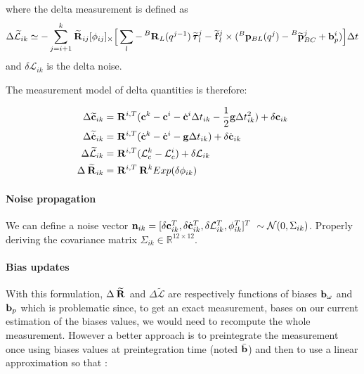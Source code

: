 \documentclass[11pt]{article}
\newcommand{\Rot}[2]{\prescript{#1}{}{\bfR}_{#2}}
\newcommand{\Rotm}[2]{\prescript{#1}{}{\widetilde{\bfR}}_{#2}}
\newcommand{\noise}{\bfn}
\newcommand{\bias}{\bfb}
\newcommand{\posi}[2]{\prescript{#1}{}{\bfp}_{#2}}
\newcommand{\posim}[2]{\prescript{#1}{}{\widetilde{\bfp}}_{#2}}
\newcommand{\forcem}[2]{\prescript{#1}{}{\widetilde{\bff}}_{#2}}
\newcommand{\torquem}[2]{\prescript{#1}{}{\widetilde{\pmb{\tau}}}_{#2}}
\newcommand{\AM}{\mathcal{L}}
\newcommand{\AMm}{\widetilde{\mathcal{L}}}
\newcommand{\COM}{\bfc}
\newcommand{\COMm}{\widetilde{\bfc}}
\newcommand{\COMd}{\dot{\bfc}}
\newcommand{\COMdm}{\widetilde{\dot{\bfc}}}
\newcommand{\grav}{\bfg}
\newcommand{\Gaussian}[2]{\mathcal{N}({#1},{#2})}
\newcommand{\Reals}{\mathbb{R}}
\begin{document}
where the delta measurement is defined as 
\begin{equation}
    \Delta \AMm_{ik} \simeq -\sum_{j=i+1}^{k} \Rotm{}{ij}[\phi_{ij}]_{\times} \Big[ 
    \sum_l -\Rot{B}{L}(q^{j-1}) \torquem{}{l}^{j} - \forcem{}{l}^{j} \times (\posi{B}{BL}(q^j) - \posim{B}{BC}^j + \bias_{p}^i) \Big]  \Delta t
\end{equation}
and $\delta \AM_{ik}$ is the delta noise. 

The measurement model of delta quantities is therefore:

\begin{equation}
\begin{split}
\Delta \COMm_{ik}  &= \Rot{}{}^{i,T} (\COM^k - \COM^i - \COMd{}{}^i \Delta t_{ik} - \frac{1}{2}\grav \Delta t_{ik}^2) + \delta \COM_{ik} 
\\
\Delta \COMdm_{ik} &= \Rot{}{}^{i,T} (\COMd^{k} - \COMd^{i} - \bfg \Delta t_{ik}) + \delta \COMd_{ik}
\\
\Delta \AMm_{ik}   &= \Rot{}{}^{i,T} (\AM_c^{k} - \AM_c^{i}) + \delta \AM_{ik}
\\
\Delta \Rotm{}{ik} &= \Rot{}{}^{i,T} \Rot{}{}^{k} Exp(\delta \phi_{ik})
\end{split}
\end{equation}


\paragraph{Noise propagation}
We can define a noise vector $\noise_{ik} = [\delta \COM_{ik}^T, \delta \COMd_{ik}^T, \delta \AM_{ik}^T, \phi_{ik}^T]^T ~ \sim \Gaussian{0}{\Sigma_{ik}}$. Properly deriving the covariance matrix $\Sigma_{ik} \in \Reals^{12 \times 12}$. 



\paragraph{Bias updates}
With this formulation, $\Delta \Rotm{}{}$ and $\Delta \AMm{}{}$ are respectively functions of biases $\bias_{\omega}$ and $\bias_{p}$ which is problematic since, to get an exact measurement, bases on our current estimation of the biases values, we would need to recompute the whole measurement. However a better approach is to preintegrate the measurement once using biases values at preintegration time (noted $\bar{\bias}$) and then to use a linear approximation so that :
\end{document}

